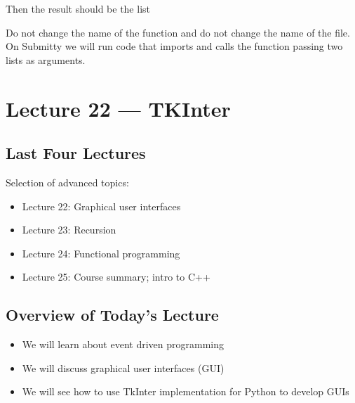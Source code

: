 \documentclass[letterpaper,10pt,english]{sphinxmanual}
\begin{document}
\begin{enumerate}
Then the result  should be the list

%
\begin{sphinxVerbatim}[commandchars=\\\{\}]
\PYG{p}{[}                  \PYG{p}{]}
\end{sphinxVerbatim}

Do not change the name of the function and do not change the name
of the file.  On Submitty we will run code that imports
 and calls the function  passing two lists as
arguments.

\end{enumerate}


\chapter{Lecture 22 — TKInter}
\label{\detokenize{lecture_notes/lec22_tkinter:lecture-22-tkinter}}\label{\detokenize{lecture_notes/lec22_tkinter::doc}}

\section{Last Four Lectures}
\label{\detokenize{lecture_notes/lec22_tkinter:last-four-lectures}}
Selection of advanced topics:
\begin{itemize}
\item {} 
Lecture 22:  Graphical user interfaces

\item {} 
Lecture 23:  Recursion

\item {} 
Lecture 24:  Functional programming

\item {} 
Lecture 25:  Course summary; intro to C++

\end{itemize}


\section{Overview of Today’s Lecture}
\label{\detokenize{lecture_notes/lec22_tkinter:overview-of-today-s-lecture}}\begin{itemize}
\item {} 
We will learn about event driven programming

\item {} 
We will discuss graphical user interfaces (GUI)

\item {} 
We will see how to use TkInter implementation for Python
to develop GUIs

\end{itemize}
\end{document}
